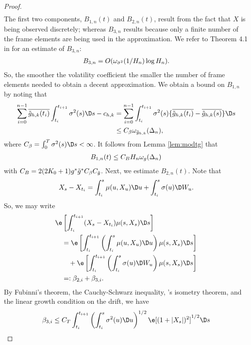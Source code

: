\begin{appendices}
\begin{proof}
\begin{align}
  \label{}
\end{align}
The first two components, $B_{1,n}(t)$ and  $B_{2,n}(t)$, result from the fact that   $X$ is being observed discretely; whereas  $B_{3,n}$ results because only a finite number of the frame elements are being used in the approximation. We refer to Theorem 4.1 in  \cite{Zhang2008} for an estimate of  $B_{3,n}$:
\begin{align}
  B_{3,n} = O(\omega_{\bar{\sigma}^2}(1/H_n)\log H_n)\notag.
  \label{}
\end{align}
So, the smoother the volatility coefficient the smaller the number of frame elements needed to obtain a decent approximation. We obtain a bound on $B_{1,n}$  by noting that 
\begin{align}
 \sum_{i=0}^{n-1} \btghki\int_{t_i}^{t_{i+1}}\sigma^2(s) \D s -\chk\notag
  & = \sum_{i=0}^{n-1}\int_{t_i}^{t_{i+1}}\sigma^2(s)\{\btghki - \btghks\} \D s\notag \\
  &\le C_\beta\omega_{\tghk} (\Delta_n), \notag
  \label{}
\end{align}
where  $C_\beta = \int^T_0 \sigma^2(s) \D s < \infty$. It follows from Lemma \eqref{lem:modtg} that  
\begin{align}
  B_{1,n}(t) \le C_B H_n\omega_{g}(\Delta_n)\notag 
\end{align}
with $C_B = 2(2K_0 + 1)g^*\tilde{g}^* C_\beta C_{\tilde{g}}$. 
Next, we estimate $B_{2,n} (t)$. Note that
\begin{align}
  X_s - X_{t_i} = \int_{t_i}^s \mu(u,X_u) \D u + \int^s_{t_i} \sigma(u)\D W_u. \notag
  \label{}
\end{align}
So, we may write
\begin{align}
  &\e\left[\int_{t_i}^{t_{i+1}}(X_s - X_{t_i}) \mu(s,X_s) \D s\right]\notag\\
  &\quad = \e\left[\int_{t_i}^{t_{i+1}}\left( \int_{t_i}^s \mu(u,X_u) \D u\right)\mu(s,X_s) \D s\right] \notag \\
  &\qquad + \e\left[\int_{t_i}^{t_{i+1}}\left( \int_{t_i}^s \sigma(u) \D W_u\right)\mu(s,X_s) \D s\right]\notag \\
  &\quad =: \beta_{2,i} + \beta_{3,i}. \notag
\end{align}
By Fubinni's theorem,  the Cauchy-Schwarz inequality,  \ito's isometry theorem, and the linear growth condition on the drift, we have
\begin{align}
  \beta_{3,i} &\le C_T\int_{t_i}^{t_{i+1}}\left( \int_{t_i}^s \sigma^2(u) \D u\right)^{1/2}\e[(1+\vert X_s\vert)^2]^{1/2} \D s\notag\\

\end{align}
\end{proof}
\end{appendices}
